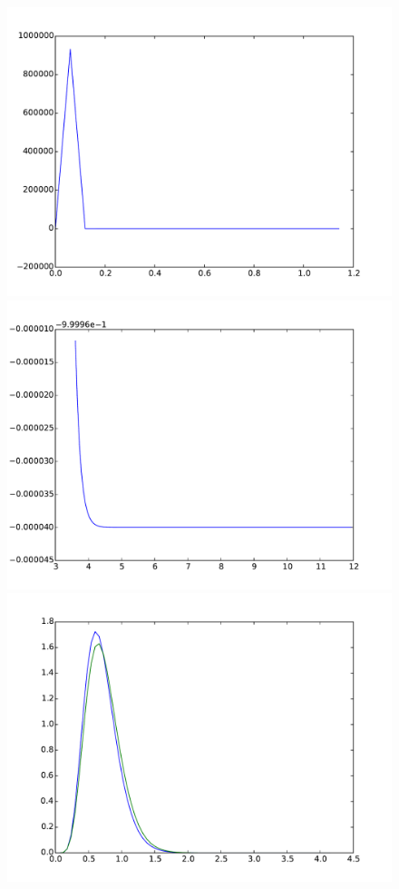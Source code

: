 \documentclass{article}
\begin{document}
\begin{figure}[htb]
\begin{minipage}{.3\textwidth}
		\includegraphics[width=0.97\linewidth]{bootstrap-filter/relative_beginning_simple_3_1.pdf}
	\end{minipage}
	\begin{minipage}{.3\textwidth}
		\centering
		\includegraphics[width=0.97\linewidth]{bootstrap-filter/relative_tail_simple_3_1.pdf}
	\end{minipage}
	\begin{minipage}{.3\textwidth}
		\centering
		\includegraphics[width=0.97\linewidth]{bootstrap-filter/global_simple_3_9.pdf}

\end{minipage}
\end{figure}
\end{document}
